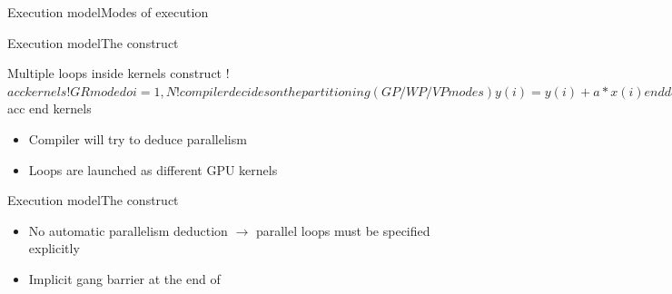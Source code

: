 \documentclass[12pt,aspectratio=169]{beamer}
\begin{document}
\begin{frame}{Execution model}{Modes of execution}
\begin{figure}
{    }
  \end{figure}
\end{frame}


\begin{frame}[fragile]{Execution model}{The  construct}
  \begin{Fortranlisting}{Multiple loops inside kernels construct}
!$acc kernels
    !GR mode
    do i = 1, N
        !compiler decides on the partitioning (GP/WP/VP modes)
        y(i) = y(i) + a*x(i)
    enddo
    do i = 1, N
        !compiler decides on the partitioning (GP/WP/VP modes)
        y(i) = b*y(i) + a*x(i)
    enddo
!$acc end kernels
  \end{Fortranlisting}
  \begin{itemize}
  \item Compiler will try to deduce parallelism
  \item Loops are launched as different GPU kernels
  \end{itemize}
\end{frame}

\begin{frame}[fragile]{Execution model}{The  construct}
  \begin{itemize}
  \item No automatic parallelism deduction $\rightarrow$ parallel loops must
    be specified explicitly
  \item Implicit gang barrier at the end of 
  \end{itemize}
\end{frame}
\end{document}
